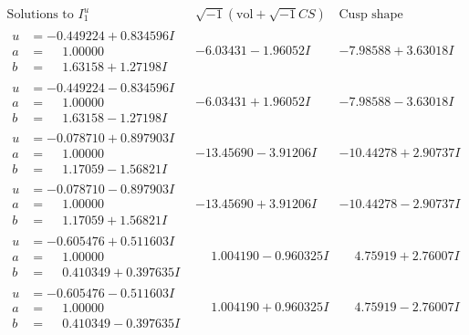 \documentclass[1p]{elsarticle_modified}
\theoremstyle{definition}
\newcommand{\I}{\sqrt{-1}}
\begin{document}
$$\begin{array}{c|c|c}  
\text{Solutions to }I^u_{1}& \I (\text{vol} + \sqrt{-1}CS) & \text{Cusp shape}\\
 \hline 
\begin{aligned}
u &= -0.449224 + 0.834596 I \\
a &= \phantom{-}1.00000\phantom{ +0.000000I} \\
b &= \phantom{-}1.63158 + 1.27198 I\end{aligned}
 & -6.03431 - 1.96052 I & -7.98588 + 3.63018 I \\ \hline\begin{aligned}
u &= -0.449224 - 0.834596 I \\
a &= \phantom{-}1.00000\phantom{ +0.000000I} \\
b &= \phantom{-}1.63158 - 1.27198 I\end{aligned}
 & -6.03431 + 1.96052 I & -7.98588 - 3.63018 I \\ \hline\begin{aligned}
u &= -0.078710 + 0.897903 I \\
a &= \phantom{-}1.00000\phantom{ +0.000000I} \\
b &= \phantom{-}1.17059 - 1.56821 I\end{aligned}
 & -13.45690 - 3.91206 I & -10.44278 + 2.90737 I \\ \hline\begin{aligned}
u &= -0.078710 - 0.897903 I \\
a &= \phantom{-}1.00000\phantom{ +0.000000I} \\
b &= \phantom{-}1.17059 + 1.56821 I\end{aligned}
 & -13.45690 + 3.91206 I & -10.44278 - 2.90737 I \\ \hline\begin{aligned}
u &= -0.605476 + 0.511603 I \\
a &= \phantom{-}1.00000\phantom{ +0.000000I} \\
b &= \phantom{-}0.410349 + 0.397635 I\end{aligned}
 & \phantom{-}1.004190 - 0.960325 I & \phantom{-}4.75919 + 2.76007 I \\ \hline\begin{aligned}
u &= -0.605476 - 0.511603 I \\
a &= \phantom{-}1.00000\phantom{ +0.000000I} \\
b &= \phantom{-}0.410349 - 0.397635 I\end{aligned}
 & \phantom{-}1.004190 + 0.960325 I & \phantom{-}4.75919 - 2.76007 I \\ \hline\begin{aligned}

\end{aligned}
\end{array}$$
\end{document}
